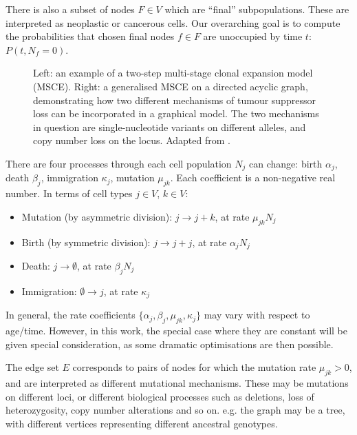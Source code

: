 \documentclass{article}
\begin{document}
There is also a subset of nodes $F \in V$ which are ``final'' subpopulations. These
are interpreted as neoplastic or cancerous cells. Our overarching goal is to
compute the probabilities that chosen final nodes $f \in F$ are
unoccupied by time $t$: $P(t, N_f = 0)$.

\begin{figure}
    \caption{Left: an example of a two-step multi-stage clonal expansion
    model (MSCE). Right: a generalised MSCE on a directed acyclic graph,
    demonstrating how two different mechanisms of tumour suppressor loss can be
    incorporated in a graphical model. The two mechanisms in question are
    single-nucleotide variants on different alleles, and copy number loss on the
    locus. Adapted from \cite{Paterson2022}.}
\end{figure}

There are four processes through each cell population $N_j$ can change: birth
$\alpha_j$, death $\beta_j$, immigration $\kappa_j$, mutation $\mu_{jk}$. Each
coefficient is a non-negative real number. In terms of cell types $j \in V$, $k \in V$:

\begin{itemize}
    \item Mutation (by asymmetric division): $j \rightarrow j + k$, at rate
    $\mu_{jk} N_j$
    \item Birth (by symmetric division): $j \rightarrow j + j$, at rate
    $\alpha_j N_j$
    \item Death: $j \rightarrow \emptyset$, at rate $\beta_j N_j$
    \item Immigration: $\emptyset \rightarrow j$, at rate $\kappa_j$
\end{itemize}

In general, the rate coefficients $\{\alpha_j, \beta_j, \mu_{jk},
\kappa_j\}$ may vary with respect to age/time. However, in this work, the
special case where they are constant will be given special consideration, as
some dramatic optimisations are then possible.

The edge set $E$ corresponds to pairs of nodes for which the mutation rate
$\mu_{jk} > 0$, and are interpreted as different mutational mechanisms. These may be
mutations on different loci, or different biological processes such as
deletions, loss of heterozygosity, copy number alterations and so on. 
e.g. the graph may be a tree, with different vertices representing different
ancestral genotypes.
\end{document}
